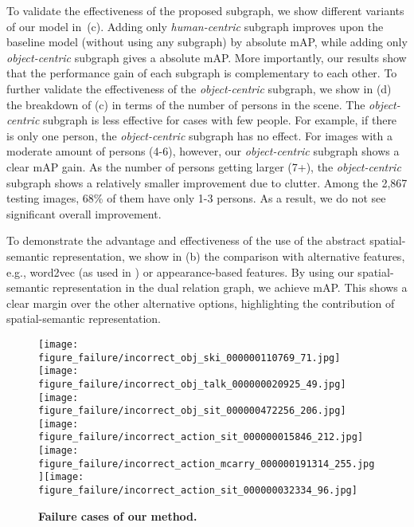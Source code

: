 To validate the effectiveness of the proposed subgraph, we show different variants of our model in~(c).
Adding only \emph{human-centric} subgraph improves upon the baseline model (without using any subgraph) by  absolute mAP, while adding only \emph{object-centric} subgraph gives a  absolute mAP.
More importantly, our results show that the performance gain of each subgraph is complementary to each other.
To further validate the effectiveness of the \emph{object-centric} subgraph, we show in (d) the breakdown of (c) in terms of the number of persons in the scene. The \emph{object-centric} subgraph is less effective for cases with few people. For example, if there is only one person, the \emph{object-centric} subgraph has no effect. For images with a moderate amount of persons (4-6), however, our \emph{object-centric} subgraph shows a clear  mAP gain. As the number of persons getting larger (7+), the \emph{object-centric} subgraph shows a relatively smaller improvement due to clutter. Among the 2,867 testing images, 68\% of them have only 1-3 persons. As a result, we do not see significant overall improvement.

To demonstrate the advantage and effectiveness of the use of the abstract spatial-semantic representation, we show in (b) the comparison with alternative features, e.g., word2vec (as used in \cite{Lu-ECCV-Prior}) or appearance-based features.
By using our spatial-semantic representation in the dual relation graph, we achieve  mAP. This shows a clear margin over the other alternative options, highlighting the contribution of spatial-semantic representation.







\begin{figure*}[!t]
\centering
\texttt{[image: figure\_failure/incorrect\_obj\_ski\_000000110769\_71.jpg]}\hfill \texttt{[image: figure\_failure/incorrect\_obj\_talk\_000000020925\_49.jpg]}\hfill \texttt{[image: figure\_failure/incorrect\_obj\_sit\_000000472256\_206.jpg]}\hfill \texttt{[image: figure\_failure/incorrect\_action\_sit\_000000015846\_212.jpg]}\hfill \texttt{[image: figure\_failure/incorrect\_action\_mcarry\_000000191314\_255.jpg]}\hfill \texttt{[image: figure\_failure/incorrect\_action\_sit\_000000032334\_96.jpg]} \hfill
{}
\caption{
\textbf{Failure cases of our method.}
}
\label{fig:failure}
\end{figure*} 
